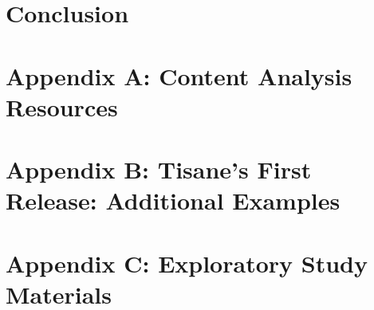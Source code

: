 \documentclass[11pt]{book}
\begin{document}
\chapter{Conclusion}
\label{chapter:conclusion}


\clearpage
{}
\singlespacing



\newpage
\newcommand{\beginsupplement}{%
    \setcounter{chapter}{0}
    \renewcommand{\thechapter}{\Alph{chapter}}%
 }

\appendix
\beginsupplement
\chapter{Appendix A: Content Analysis Resources}
\label{chapter:appHypoForm}


\chapter{Appendix B: Tisane's First Release: Additional Examples}
\label{chapter:appTisane}


\chapter{Appendix C: Exploratory Study Materials}
\label{chapter:apprTisane} %

\end{document}
